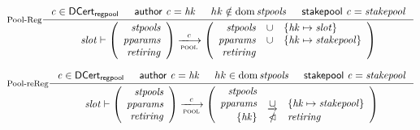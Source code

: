 \begin{figure}
  \begin{equation}\label{eq:pool-reg}
    \inference[Pool-Reg]
    {
      \var{c}\in\DCertRegPool
      & \cauthor{c} = \var{hk}
      & hk \notin \dom \var{stpools}
      & \stakepool{c} = \var{stakepool}
    }
    {
      \var{slot} \vdash
      \left(
      \begin{array}{r}
        \var{stpools} \\
        \var{pparams} \\
        \var{retiring}
      \end{array}
      \right)
      \trans{pool}{c}
      \left(
      \begin{array}{rcl}
        \var{stpools} & \union
                      & \{\var{hk} \mapsto \var{slot}\} \\
        \var{pparams} & \union
                      & \{\var{hk} \mapsto \var{stakepool}\} \\
       \var{retiring} \\
      \end{array}
      \right)
    }
  \end{equation}

  \begin{equation}\label{eq:pool-rereg}
    \inference[Pool-reReg]
    {
      \var{c}\in\DCertRegPool
      & \cauthor{c} = \var{hk}
      & hk \in \dom \var{stpools}
      & \stakepool{c} = \var{stakepool}
    }
    {
      \var{slot} \vdash
      \left(
      \begin{array}{r}
        \var{stpools} \\
        \var{pparams} \\
        \var{retiring}
      \end{array}
      \right)
      \trans{pool}{c}
      \left(
      \begin{array}{rcl}
        \var{stpools} \\
        \var{pparams} & \unionoverrideRight
                      & \{\var{hk} \mapsto \var{stakepool}\} \\
        \{\var{hk}\} & \subtractdom & \var{retiring} \\
      \end{array}
      \right)
    }
  \end{equation}


\end{figure}
